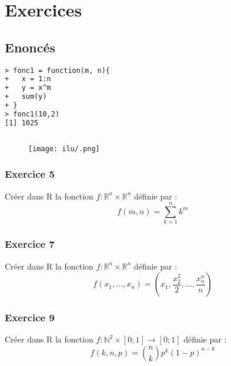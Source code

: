 

\section*{Exercices}
\subsection*{Enoncés}


\begin{lstlisting}[language=html]
> fonc1 = function(m, n){
+   x = 1:n
+   y = x^m
+   sum(y)
+ }
> fonc1(10,2)
[1] 1025
\end{lstlisting}


\begin{lstlisting}[language=html]

\end{lstlisting}


\begin{figure}[H]\begin{center}\texttt{[image: ilu/.png]}\end{center}\end{figure}



\subsubsection*{Exercice 5}
Créer dans R la fonction $f : \mathbb{R}^{n} \times \mathbb{R}^{n}$ définie par :
$$f(m,n)=\sum_{k=1}^{n} k^{m}$$



\subsubsection*{Exercice 7}
Créer dans R la fonction $f : \mathbb{R}^{n} \times \mathbb{R}^{n}$ définie par :
$$f(x_{1},\dots,x_{n}) = \left(x_{1},\frac{x_{2}^{2}}{2},\dots,\frac{x_{n}^{n}}{n}\right)$$

\subsubsection*{Exercice 9}
Créer dans R la fonction $f : \mathbb{N}^{2} \times [0;1] \rightarrow [0; 1]$ définie par :
$$f(k,n,p) = \binom{n}{k}p^{k}(1-p)^{n-k}$$